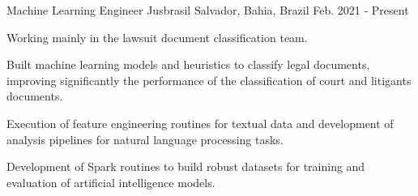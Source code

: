 

\begin{cventries}

  \cventry
    {Machine Learning Engineer}
    {Jusbrasil}
    {Salvador, Bahia, Brazil}
    {Feb. 2021 - Present}
    {
        \begin{cvitems}
        \item {Working mainly in the lawsuit document classification team.}
        \item {Built machine learning models and heuristics to classify legal documents, improving significantly the performance of the classification of court and litigants documents.}
        \item {Execution of feature engineering routines for textual data and development of analysis pipelines for natural language processing tasks.}
        \item {Development of Spark routines to build robust datasets for training and evaluation of artificial intelligence models.}
        \end{cvitems}
    }


\end{cventries}
